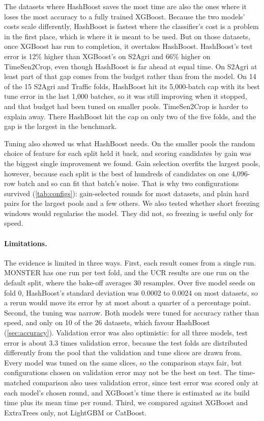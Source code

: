 \documentclass[a4paper, 11pt]{article}
\begin{document}
The datasets where HashBoost saves the most time are also the ones where it
loses the most accuracy to a fully trained XGBoost. Because the two models'
costs scale differently, HashBoost is fastest where the
classifier's cost is a problem in the first place, which is where it is
meant to be used. But on those datasets, once XGBoost has run to completion,
it overtakes HashBoost. HashBoost's test error is 12\% higher than XGBoost's
on S2Agri and 66\% higher on TimeSen2Crop, even though HashBoost is far
ahead at equal time.
On S2Agri at least part of that gap comes from the budget rather than from
the model. On 14 of the 15 S2Agri and Traffic folds, HashBoost hit its
5,000-batch cap with its best tune error in the last 1,000 batches, so it
was still improving when it stopped, and that budget had been tuned on
smaller pools. TimeSen2Crop is harder to explain away. There HashBoost hit
the cap on only two of the five folds, and the gap is the largest in the
benchmark.

Tuning also showed us what HashBoost needs. On the smaller pools the random
choice of feature for each split held it back, and scoring candidates by
gain was the biggest single improvement we found. Gain selection overfits
the largest pools, however, because each split is the best of hundreds of
candidates on one 4,096-row batch and so can fit that batch's noise. That is
why two configurations survived (\cref{tab:configs}): gain-selected rounds
for most datasets, and plain hard pairs for the largest pools and a few
others. We also tested whether short freezing windows would regularise the
model. They did not, so freezing is useful only for speed.

\paragraph{Limitations.}
The evidence is limited in three ways. First, each result comes from a
single run. MONSTER has one run per test fold, and the UCR results are one
run on the default split, where the bake-off averages 30 resamples. Over
five model seeds on fold 0, HashBoost's standard deviation was 0.0002 to
0.0024 on most datasets, so a rerun would move its error by at most about a
quarter of a percentage point. Second, the tuning was narrow. Both models
were tuned for accuracy rather than speed, and only on 10 of the 26
datasets, which favour HashBoost (\cref{sec:accuracy}). Validation error was also optimistic: for
all three models, test error is about 3.3 times validation error, because
the test folds are distributed differently from the pool that the
validation and tune slices are drawn from. Every model was tuned on the same
slices, so the comparison stays fair, but configurations chosen on
validation error may not be the best on test. The time-matched comparison
also uses validation error, since test error was scored only at each
model's chosen round, and XGBoost's time there is estimated as its build
time plus its mean time per round. Third, we compared against XGBoost and ExtraTrees only, not LightGBM or
CatBoost.
\end{document}
